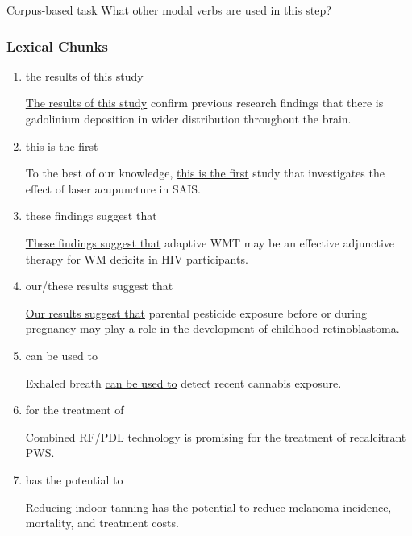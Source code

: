 \documentclass[a4paper]{ctexbook}
\begin{document}
    \begin{task}{\heiti Corpus-based task}
      What other modal verbs are used in this step?
    \end{task}

    \subsubsection{Lexical Chunks}

    \begin{enumerate}
      \item the results of this study
      \begin{eg}{}
        \uline{The results of this study} confirm previous research findings that there is gadolinium deposition in wider distribution throughout the brain.
      \end{eg}

      \item this is the first
      \begin{eg}{}
        To the best of our knowledge, \uline{this is the first} study that investigates the effect of laser acupuncture in SAIS.  
      \end{eg}

      \item these findings suggest that
      \begin{eg}{}
        \uline{These findings suggest that} adaptive WMT may be an effective adjunctive therapy for WM deficits in HIV participants.  
      \end{eg}

      \item our/these results suggest that
      \begin{eg}{}
        \uline{Our results suggest that} parental pesticide exposure before or during pregnancy may play a role in the development of childhood retinoblastoma. 
      \end{eg}

      \item can be used to
      \begin{eg}{}
        Exhaled breath \uline{can be used to} detect recent cannabis exposure.
      \end{eg}

      \item for the treatment of
      \begin{eg}{}
        Combined RF/PDL technology is promising \uline{for the treatment of} recalcitrant PWS. 
      \end{eg}

      \item has the potential to
      \begin{eg}{}
        Reducing indoor tanning \uline{has the potential to} reduce melanoma incidence, mortality, and treatment costs. 
      \end{eg}

    \end{enumerate}
\end{document}
